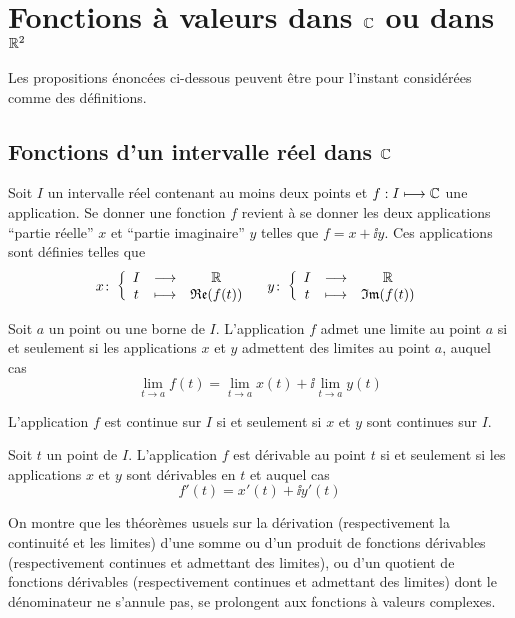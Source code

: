 \chapter{Fonctions à valeurs dans $\mathbb{C}$ ou dans $\mathbb{R}^2$}

Les propositions énoncées ci-dessous peuvent être pour l'instant considérées comme des définitions.

\section{Fonctions d'un intervalle réel dans $\mathbb{C}$}

Soit $I$ un intervalle réel contenant au moins deux points et $f : I \longmapsto \mathbb{C}$ une application. Se donner une fonction $f$ revient à se donner les deux applications ``partie réelle'' $x$  et ``partie imaginaire'' $y$ telles que $f=x+\ii y$. Ces applications sont définies telles que
\begin{equation}
  x\colon \left\{\begin{array}{ccc} I & \longrightarrow &\mathbb{R}\\ t & \longmapsto & \mathfrak{Re}(f(t)) \end{array} \right. \quad   y\colon \left\{\begin{array}{ccc} I & \longrightarrow &\mathbb{R}\\ t & \longmapsto & \mathfrak{Im}(f(t)) \end{array} \right.
\end{equation}
\begin{prop}
  Soit $a$ un point ou une borne de $I$. L'application $f$ admet une limite au point $a$ si et seulement si les applications $x$ et $y$ admettent des limites au point $a$, auquel cas
  \begin{equation}
    \lim\limits_{t \to a} f(t) = \lim\limits_{t \to a} x(t) +\ii \lim\limits_{t \to a} y(t)
  \end{equation}
\end{prop}
\begin{prop}
  L'application $f$ est continue sur $I$ si et seulement si $x$ et $y$ sont continues sur $I$.
\end{prop}
\begin{prop}
  Soit $t$ un point de $I$. L'application $f$ est dérivable au point $t$ si et seulement si les applications $x$ et $y$ sont dérivables en $t$ et auquel cas
  \begin{equation}
    f'(t) = x'(t) + \ii y'(t)
  \end{equation}
\end{prop}

On montre que les théorèmes usuels sur la dérivation (respectivement la continuité et les limites) d'une somme ou d'un produit de fonctions dérivables (respectivement continues et admettant des limites), ou d'un quotient de fonctions dérivables (respectivement continues et admettant des limites) dont le dénominateur ne s'annule pas, se prolongent aux fonctions à valeurs complexes.

